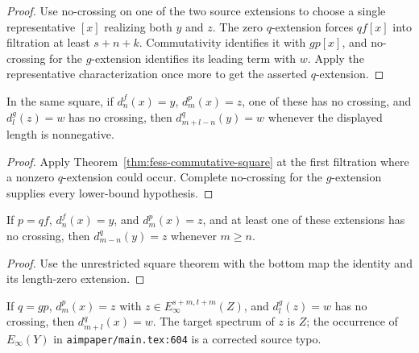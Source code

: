 \begin{proof}
  Use no-crossing on one of the two source extensions to choose a single
  representative $[x]$ realizing both $y$ and $z$.  The zero $q$-extension
  forces $qf[x]$ into filtration at least $s+n+k$.  Commutativity identifies
  it with $gp[x]$, and no-crossing for the $g$-extension identifies its leading
  term with $w$.  Apply the representative characterization once more to get
  the asserted $q$-extension.
\end{proof}

\begin{corollary}
  \label{cor:fess-square-naturality}
  \notready
  In the same square, if $d_n^f(x)=y$, $d_m^p(x)=z$, one of these has no
  crossing, and $d_l^g(z)=w$ has no crossing, then
  $d_{m+l-n}^q(y)=w$ whenever the displayed length is nonnegative.
\end{corollary}

\begin{proof}
  Apply Theorem~\ref{thm:fess-commutative-square} at the first filtration where
  a nonzero $q$-extension could occur.  Complete no-crossing for the
  $g$-extension supplies every lower-bound hypothesis.
\end{proof}

\begin{corollary}
  \label{cor:fess-triangle-shift}
  \notready
  If $p=qf$, $d_n^f(x)=y$, and $d_m^p(x)=z$, and at least one of these
  extensions has no crossing, then $d_{m-n}^q(y)=z$ whenever $m\ge n$.
\end{corollary}

\begin{proof}
  Use the unrestricted square theorem with the bottom map the identity and
  its length-zero extension.
\end{proof}

\begin{corollary}
  \label{cor:fess-composition}
  \notready
  If $q=gp$, $d_m^p(x)=z$ with
  $z\in E_\infty^{s+m,t+m}(Z)$, and $d_l^g(z)=w$ has no crossing, then
  $d_{m+l}^q(x)=w$.  The target spectrum of $z$ is $Z$; the occurrence of
  $E_\infty(Y)$ in \texttt{aimpaper/main.tex:604} is a corrected source typo.
\end{corollary}

